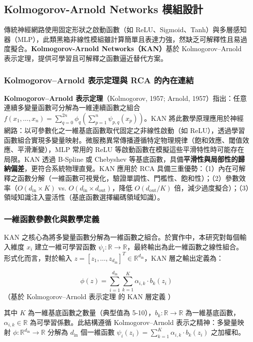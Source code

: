 \documentclass[10pt,a4paper,twocolumn]{article}
\begin{document}
\subsection{Kolmogorov-Arnold Networks 模組設計}

傳統神經網路使用固定形狀之啟動函數（如 ReLU、Sigmoid、Tanh）與多層感知器（MLP），此類黑箱非線性模組雖計算簡單且表達力強，然缺乏可解釋性且易過度擬合。\textbf{Kolmogorov-Arnold Networks（KAN）}基於 Kolmogorov–Arnold 表示定理，提供可學習且可解釋之函數逼近替代方案。

\subsubsection{Kolmogorov–Arnold 表示定理與 RCA 的內在連結}

\textbf{Kolmogorov–Arnold 表示定理}（Kolmogorov, 1957; Arnold, 1957）指出：任意連續多變量函數可分解為一維連續函數之組合 $f(x_1, \ldots, x_n) = \sum_{q=0}^{2n} \phi_q\left( \sum_{p=1}^{n} \psi_{p,q}(x_p) \right)$。KAN 將此數學原理應用於神經網路：以可參數化之一維基底函數取代固定之非線性啟動（如 ReLU），透過學習函數組合實現多變量映射。微服務異常傳播遵循特定物理規律（飽和效應、閾值效應、平滑漸變），MLP 常用的 ReLU 等啟動函數在模擬這些平滑特性時可能存在局限。KAN 透過 B-Spline 或 Chebyshev 等基底函數，具備\textbf{平滑性與局部性的歸納偏差}，更符合系統物理直覺。KAN 應用於 RCA 具備三重優勢：（1）內在可解釋之函數分解（一維函數可視覺化，驗證單調性、門檻性、飽和性）；（2）參數效率（$O(d_{\text{in}} \times K)$ vs. $O(d_{\text{in}} \times d_{\text{out}})$，降低 $O(d_{\text{out}}/K)$ 倍，減少過度擬合）；（3）領域知識注入靈活性（基底函數選擇編碼領域知識）。

\subsubsection{一維函數參數化與數學定義}

KAN 之核心為將多變量函數分解為一維函數之組合。於實作中，本研究對每個輸入維度 $x_i$ 建立一維可學習函數 $\psi_i: \mathbb{R} \to \mathbb{R}$，最終輸出為此一維函數之線性組合。形式化而言，對於輸入 $z = [z_1, \ldots, z_{d_{\text{in}}}]^T \in \mathbb{R}^{d_{\text{in}}}$，KAN 層之輸出定義為：

\begin{equation}
\phi(z) = \sum_{i=1}^{d_{\text{in}}} \sum_{k=1}^{K} \alpha_{i,k} \cdot b_k(z_i)
\end{equation}
（基於 Kolmogorov–Arnold 表示定理 \cite{kolmogorov1957} 的 KAN 層定義 \cite{kan2024}）

其中 $K$ 為一維基底函數之數量（典型值為 5-10），$b_k: \mathbb{R} \to \mathbb{R}$ 為一維基底函數，$\alpha_{i,k} \in \mathbb{R}$ 為可學習係數。此結構遵循 Kolmogorov–Arnold 表示之精神：多變量映射 $\phi: \mathbb{R}^{d_{\text{in}}} \to \mathbb{R}$ 分解為 $d_{\text{in}}$ 個一維函數 $\psi_i(z_i) = \sum_{k=1}^{K} \alpha_{i,k} \cdot b_k(z_i)$ 之加權和。
\end{document}
